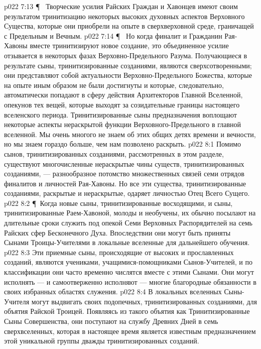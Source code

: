\vs p022 7:13 \P\ \bibnobreakspace {} Творческие усилия Райских Граждан и Хавонцев имеют своим результатом тринитизацию некоторых высоких духовных аспектов Верховного Существа, которые они приобрели на опыте в сверхверховной среде, граничащей с Предельным и Вечным.
\vs p022 7:14 \P\ \bibnobreakspace {} Но когда финалит и Гражданин Рая\hyp{}Хавоны вместе тринитизируют новое создание, это объединенное усилие отзывается в некоторых фазах Верховно\hyp{}Предельного Разума. Получающиеся в результате сыны, тринитизированные созданиями, являются сверхсотворенными; они представляют собой актуальности Верховно\hyp{}Предельного Божества, которые на опыте иным образом не были достигнуты и которые, следовательно, автоматически попадают в сферу действия Архитекторов Главной Вселенной, опекунов тех вещей, которые выходят за созидательные границы настоящего вселенского периода. Тринитизированные сыны предназначения воплощают некоторые аспекты нераскрытой функции Верховного\hyp{}Предельного в главной вселенной. Мы очень многого не знаем об этих общих детях времени и вечности, но мы знаем гораздо больше, чем нам позволено раскрыть.
\vs p022 8:1 Помимо сынов, тринитизированных созданиями, рассмотренных в этом разделе, существуют многочисленные нераскрытые чины существ, тринитизированных созданиями, --- разнообразное потомство множественных связей семи отрядов финалитов и личностей Рая\hyp{}Хавоны. Но все эти существа, тринитизированные созданиями, раскрытые и нераскрытые, одаряет личностью Отец Всего Сущего.
\vs p022 8:2 \P\ Когда новые сыны, тринитизированные восходящими, и сыны, тринитизированные Раем\hyp{}Хавоной, молоды и необучены, их обычно посылают на длительные сроки служить под опекой Семи Верховных Распорядителей на семь Райских сфер Бесконечного Духа. Впоследствии они могут быть приняты Сынами Троицы\hyp{}Учителями в локальные вселенные для дальнейшего обучения.
\vs p022 8:3 Эти приемные сыны, происходящие от высоких и прославленных созданий, являются учениками, учащимися\hyp{}помощниками Сынов\hyp{}Учителей, и по классификации они часто временно числятся вместе с этими Сынами. Они могут исполнять --- и самоотверженно исполняют --- многие благородные обязанности в своих избранных областях служения.
\vs p022 8:4 В локальных вселенных Сыны\hyp{}Учителя могут выдвигать своих подопечных, тринитизированных созданиями, для объятия Райской Троицей. Появляясь из такого объятия как Тринитизированные Сыны Совершенства, они поступают на службу Древних Дней в семь сверхвселенных, которая в настоящее время является известным предназначением этой уникальной группы дважды тринитизированных созданий.
